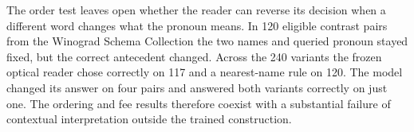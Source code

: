 The order test leaves open whether the reader can reverse its decision when a different word changes what the pronoun means. In 120 eligible contrast pairs from the Winograd Schema Collection the two names and queried pronoun stayed fixed, but the correct antecedent changed. Across the 240 variants the frozen optical reader chose correctly on 117 and a nearest-name rule on 120. The model changed its answer on four pairs and answered both variants correctly on just one. The ordering and fee results therefore coexist with a substantial failure of contextual interpretation outside the trained construction.
